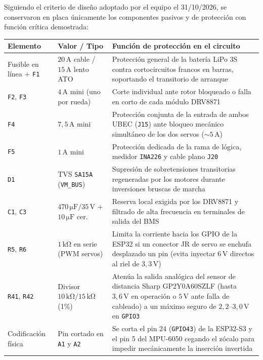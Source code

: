 \documentclass[11pt,a4paper]{report}
\newcommand{\ud}[1]{\,\mathrm{#1}}
\begin{document}
Siguiendo el criterio de diseño adoptado por el equipo el 31/10/2026, se conservaron en placa
únicamente los componentes pasivos y de protección con función crítica demostrada:

\begin{center}
\small
\begin{tabular}{@{}llp{8.8cm}@{}}
\toprule
\textbf{Elemento} & \textbf{Valor / Tipo} & \textbf{Función de protección en el circuito} \\
\midrule
Fusible en línea + \texttt{F1} & $20\ud{A}$ cable / $15\ud{A}$ lento ATO & Protección general de la batería LiPo 3S contra cortocircuitos francos en barras, soportando el transitorio de arranque \\
\texttt{F2}, \texttt{F3} & $4\ud{A}$ mini (uno por rueda) & Corte individual ante rotor bloqueado o falla en corto de cada módulo DRV8871 \\
\texttt{F4} & $7{,}5\ud{A}$ mini & Protección conjunta de la entrada de ambos UBEC (\texttt{J15}) ante bloqueo mecánico simultáneo de los dos servos ($\sim 5\ud{A}$) \\
\texttt{F5} & $1\ud{A}$ mini & Protección dedicada de la rama de lógica, medidor \texttt{INA226} y cable plano \texttt{J20} \\
\texttt{D1} & TVS \texttt{SA15A} (\texttt{VM\_BUS}) & Supresión de sobretensiones transitorias regeneradas por los motores durante inversiones bruscas de marcha \\
\texttt{C1}, \texttt{C3} & $470\ud{\mu F}/35\ud{V}$ + $10\ud{\mu F}$ cer. & Reserva local exigida por los DRV8871 y filtrado de alta frecuencia en terminales de salida del BMS \\
\texttt{R5}, \texttt{R6} & $1\ud{k\Omega}$ en serie (PWM servos) & Limita la corriente hacia los GPIO de la ESP32 si un conector JR de servo se enchufa desplazado un pin (evita inyectar $6\ud{V}$ directos al riel de $3{,}3\ud{V}$) \\
\texttt{R41}, \texttt{R42} & Divisor $10\ud{k\Omega} / 15\ud{k\Omega}$ (1\%) & Atenúa la salida analógica del sensor de distancia Sharp GP2Y0A60SZLF (hasta $3{,}6\ud{V}$ en operación o $5\ud{V}$ ante falla de cableado) a un máximo seguro de $2{,}2\text{--}3{,}0\ud{V}$ en \texttt{GPIO3} \\
Codificación física & Pin cortado en \texttt{A1} y \texttt{A2} & Se corta el pin 24 (\texttt{GPIO43}) de la ESP32-S3 y el pin 5 del MPU-6050 cegando el zócalo para impedir mecánicamente la inserción invertida \\
\bottomrule
\end{tabular}
\end{center}
\end{document}
